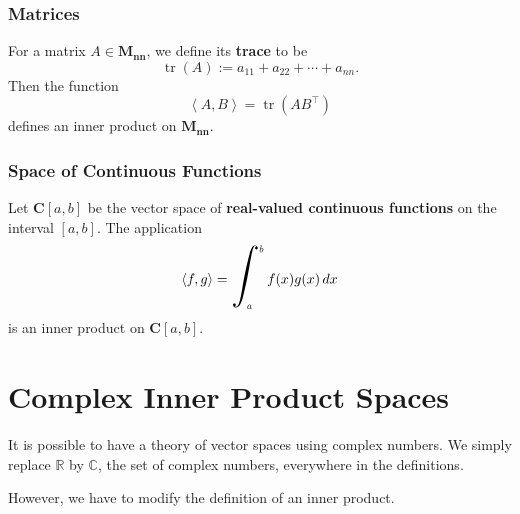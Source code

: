 \documentclass[20pt,a4paper]{extarticle}
\newcommand{\hrint}[2]{\scalebox{2}{$\displaystyle\int_{\scalebox{0.35}{$#1$}}^{\scalebox{0.35}{$#2$}}$}\,}
\DeclareMathOperator{\tr}{tr}
\newcounter{example}
\newcounter{definition}
\begin{document}
\newpage 

\subsubsection{Matrices}

\begin{example}
For a matrix $A \in \mathbf{M_{nn}}$, we define its \textbf{trace} to be
	\[
		\tr (A) := a_{11} + a_{22} + \cdots + a_{nn} .
	\]
Then the function
	\[
		\left\langle A , B \right\rangle = \tr (A B^\top )
	\]
defines an inner product on $\mathbf{M_{nn}}$. 
\end{example}

\vspace*{16pt}

\subsubsection{Space of Continuous Functions}

\begin{example}
Let $\mathbf{C} [a, b]$ be the vector space of \textbf{real-valued continuous functions} on the interval $[a, b]$. The application
	\[
		\left\langle f , g \right\rangle = \hrint{a}{b} f (x) g (x) \, dx
	\]
is an inner product on $\mathbf{C} [a, b]$.
\end{example}


\newpage

\section{Complex Inner Product Spaces}

It is possible to have a theory of vector spaces using complex numbers. We simply replace $\mathbb{R}$ by $\mathbb{C}$, the set of complex numbers, everywhere in the definitions.

However, we have to modify the definition of an inner product.
\end{document}
